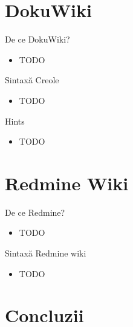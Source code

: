 \documentclass{beamer}
\begin{document}
\section{DokuWiki}

\frame{\tableofcontents[currentsection]}

\begin{frame}{De ce DokuWiki?}
  \begin{itemize}
    \item TODO
  \end{itemize}
\end{frame}

\begin{frame}{Sintaxă Creole}
  \begin{itemize}
    \item TODO
  \end{itemize}
\end{frame}

\begin{frame}{Hints}
  \begin{itemize}
    \item TODO
  \end{itemize}
\end{frame}

\section{Redmine Wiki}

\frame{\tableofcontents[currentsection]}

\begin{frame}{De ce Redmine?}
  \begin{itemize}
    \item TODO
  \end{itemize}
\end{frame}

\begin{frame}{Sintaxă Redmine wiki}
  \begin{itemize}
    \item TODO
  \end{itemize}
\end{frame}


\section{Concluzii}
\end{document}
